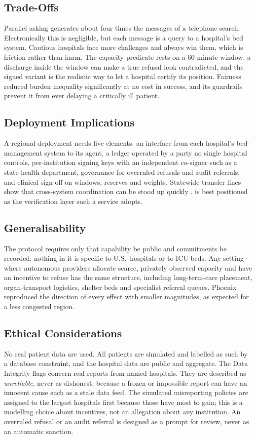 \subsection{Trade-Offs}
Parallel asking generates about four times the messages of a telephone search. Electronically this is negligible, but each message is a query to a hospital's bed system. Cautious hospitals face more challenges and always win them, which is friction rather than harm. The capacity predicate rests on a 60-minute window: a discharge inside the window can make a true refusal look contradicted, and the signed variant is the realistic way to let a hospital certify its position. Fairness reduced burden inequality significantly at no cost in success, and its guardrails prevent it from ever delaying a critically ill patient.

\subsection{Deployment Implications}
A regional deployment needs five elements: an interface from each hospital's bed-management system to its agent, a ledger operated by a party no single hospital controls, per-institution signing keys with an independent co-signer such as a state health department, governance for overruled refusals and audit referrals, and clinical sign-off on windows, reserves and weights. Statewide transfer lines show that cross-system coordination can be stood up quickly \cite{villarroel2023surgeline}. \mahros{} is best positioned as the verification layer such a service adopts.

\subsection{Generalisability}
The protocol requires only that capability be public and commitments be recorded; nothing in it is specific to U.S.\ hospitals or to ICU beds. Any setting where autonomous providers allocate scarce, privately observed capacity and have an incentive to refuse has the same structure, including long-term-care placement, organ-transport logistics, shelter beds and specialist referral queues. Phoenix reproduced the direction of every effect with smaller magnitudes, as expected for a less congested region.

\subsection{Ethical Considerations}
No real patient data are used. All patients are simulated and labelled as such by a database constraint, and the hospital data are public and aggregate. The Data Integrity flags concern real reports from named hospitals. They are described as \emph{unreliable}, never as dishonest, because a frozen or impossible report can have an innocent cause such as a stale data feed. The simulated misreporting policies are assigned to the largest hospitals first because those have most to gain; this is a modelling choice about incentives, not an allegation about any institution. An overruled refusal or an audit referral is designed as a prompt for review, never as an automatic sanction.

